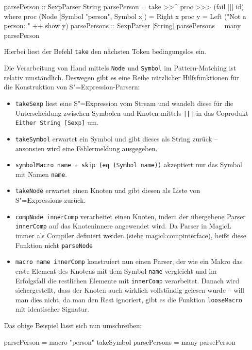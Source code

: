 \documentclass[11pt, a4paper, bibgerm]{scrbook}
\newenvironment{DIFnomarkup}{}{}
\newcommand\icode[1]{\lstinline?#1?}
\newcommand\sref{}
\newcommand{\sexp}{S"=Expression}
\newcommand{\sexps}{S"=Expressions}
\begin{document}
\begin{DIFnomarkup}\begin{code}
parsePerson :: SexpParser String
parsePerson = take >>^ proc >>> (fail ||| id)
  where proc (Node [Symbol "person", Symbol x]) = Right x
        proc y = Left ("Not a person: " ++ show y)
parsePersons :: SexpParser [String]
parsePersons = many parsePerson
\end{code}\end{DIFnomarkup} %
Hierbei liest der Befehl \icode{take} den nächsten Token bedingungslos
ein.

Die Verarbeitung von Hand mittels \icode{Node} und \icode{Symbol} im
Pattern-Matching ist relativ umständlich. Deswegen gibt es eine Reihe
nützlicher Hilfsfunktionen für die Konstruktion von \sexp{}-Parsern:

\begin{itemize}
\item \icode{takeSexp} liest eine \sexp{} vom Stream und wandelt diese
  für die Unterscheidung zwischen Symbolen und Knoten mittels
  \icode{|||} in das Coprodukt \icode{Either String [Sexp]} um.
\item \icode{takeSymbol} erwartet ein Symbol und gibt dieses als String
  zurück -- ansonsten wird eine Fehlermeldung ausgegeben.
\item \icode{symbolMacro name = skip (eq (Symbol name))} akzeptiert nur
  das Symbol mit Namen \icode{name}.
\item \icode{takeNode} erwartet einen Knoten und gibt diesen als Liste
  von \sexps{} zurück.
\item \icode{compNode innerComp} verarbeitet einen Knoten, indem der
  übergebene Parser \icode{innerComp} auf das Knoteninnere angewendet
  wird. Da Parser in MagicL immer als Compiler definiert werden (siehe
  \sref{magicl:compinterface}), heißt diese Funktion nicht
  \icode{parseNode}
\item \icode{macro name innerComp} %
  konstruiert nun einen Parser, der wie ein Makro das erste Element des
  Knotens mit dem Symbol \icode{name} vergleicht und im Erfolgsfall die
  restlichen Elemente mit \icode{innerComp} verarbeitet. Danach wird
  sichergestellt, dass der Knoten auch wirklich vollständig gelesen
  wurde -- will man dies nicht, da man den Rest ignoriert, gibt es die
  Funktion \icode{looseMacro} mit identischer Signatur.
\end{itemize}
Das obige Beispiel lässt sich nun umschreiben:
\begin{DIFnomarkup}\begin{code}
parsePerson  = macro "person" takeSymbol
parsePersons = many parsePerson
\end{code}\end{DIFnomarkup}
\end{document}
